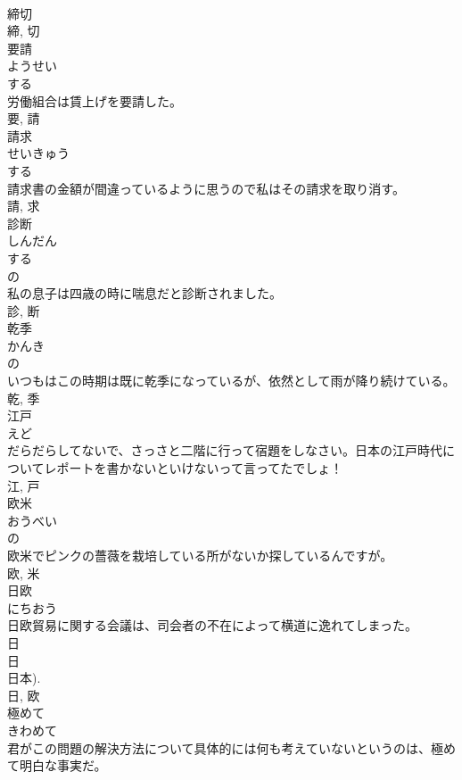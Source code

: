 \documentclass[8pt]{extreport}
\begin{document}
\begin{CJK}{UTF8}{min}
\\	締切 
\\	締, 切	
\\	要請	
\\	ようせい	
\\	する 
\\	労働組合は賃上げを要請した。	
\\	要, 請	
\\	請求	
\\	せいきゅう	
\\	する 
\\	請求書の金額が間違っているように思うので私はその請求を取り消す。	
\\	請, 求	
\\	診断	
\\	しんだん	
\\	する 
\\	の 
\\	私の息子は四歳の時に喘息だと診断されました。	
\\	診, 断	
\\	乾季	
\\	かんき	
\\	の 
\\	いつもはこの時期は既に乾季になっているが、依然として雨が降り続けている。	
\\	乾, 季	
\\	江戸	
\\	えど	
\\	だらだらしてないで、さっさと二階に行って宿題をしなさい。日本の江戸時代についてレポートを書かないといけないって言ってたでしょ！	
\\	江, 戸	
\\	欧米	
\\	おうべい	
\\	の 
\\	欧米でピンクの薔薇を栽培している所がないか探しているんですが。	
\\	欧, 米	
\\	日欧	
\\	にちおう	
\\	日欧貿易に関する会議は、司会者の不在によって横道に逸れてしまった。	
\\	日 
\\	日 
\\	日本). 
\\	日, 欧	
\\	極めて	
\\	きわめて	
\\	君がこの問題の解決方法について具体的には何も考えていないというのは、極めて明白な事実だ。	

\end{CJK}
\end{document}
